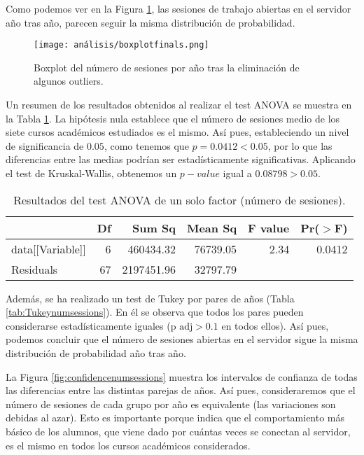 Como podemos ver en la Figura \ref{fig:boxplotsessionsyear}, las sesiones de trabajo abiertas en el servidor año tras año, parecen seguir la misma distribución de probabilidad.

\begin{figure}[H]
    \centering
    \texttt{[image: análisis/boxplotfinals.png]}
    \caption{Boxplot del número de sesiones por año tras la eliminación de algunos outliers.}
    \label{fig:boxplotsessionsyear}
\end{figure}

Un resumen de los resultados obtenidos al realizar el test ANOVA se muestra en la Tabla \ref{tab:ANOVAnumsessions}. La hipótesis nula establece que el número de sesiones medio de los siete cursos académicos estudiados es el mismo. Así pues, estableciendo un nivel de significancia de $0.05$, como tenemos que $p = 0.0412 < 0.05$, por lo que las diferencias entre las medias podrían ser estadísticamente significativas. Aplicando el test de Kruskal-Wallis, obtenemos un $p-value$ igual a $0.08798 > 0.05$.

\begin{table}[H]
\centering
\caption{Resultados del test ANOVA de un solo factor (número de sesiones).}
\label{tab:ANOVAnumsessions}
\begin{tabular}{lrrrrr}
  \hline
 & Df & Sum Sq & Mean Sq & F value & Pr($>$F) \\ 
  \hline
data[[Variable]] & 6 & 460434.32 & 76739.05 & 2.34 & 0.0412 \\ 
  Residuals         & 67 & 2197451.96 & 32797.79 &  &  \\ 
   \hline
\end{tabular}
\end{table}

Además, se ha realizado un test de Tukey por pares de años (Tabla \ref{tab:Tukeynumsessions}). En él se observa que todos los pares pueden considerarse estadísticamente iguales ($\text{p adj} > 0.1$ en todos ellos). Así pues, podemos concluir que el número de sesiones abiertas en el servidor sigue la misma distribución de probabilidad año tras año.

La Figura \ref{fig:confidencenumsessions} muestra los intervalos de confianza de todas las diferencias entre las distintas parejas de años. Así pues, consideraremos que el número de sesiones de cada grupo por año es equivalente (las variaciones son debidas al azar). Esto es importante porque indica que el comportamiento más básico de los alumnos, que viene dado por cuántas veces se conectan al servidor, es el mismo en todos los cursos académicos considerados.


